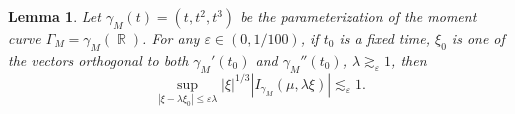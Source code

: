\documentclass[dvipsnames,letterpaper,12pt]{article}
\DeclareMathOperator{\RR}{\mathbb{R}}
\newtheorem{lemma}[theorem]{Lemma}
\begin{document}
\begin{lemma}
    Let $\gamma_M(t) = (t,t^2,t^3)$ be the parameterization of the moment curve $\Gamma_M = \gamma_M(\RR)$. For any $\varepsilon \in (0, 1/100)$, if $t_0$ is a fixed time, $\xi_0$ is one of the vectors orthogonal to both $\gamma_M'(t_0)$ and $\gamma_M''(t_0)$, $\lambda \gtrsim_\varepsilon 1$, then
    \[ \sup_{|\xi - \lambda \xi_0| \leq \varepsilon \lambda} |\xi|^{1/3} |I_{\gamma_M}(\mu, \lambda \xi)| \lesssim_\varepsilon 1. \]
\end{lemma}
\end{document}
